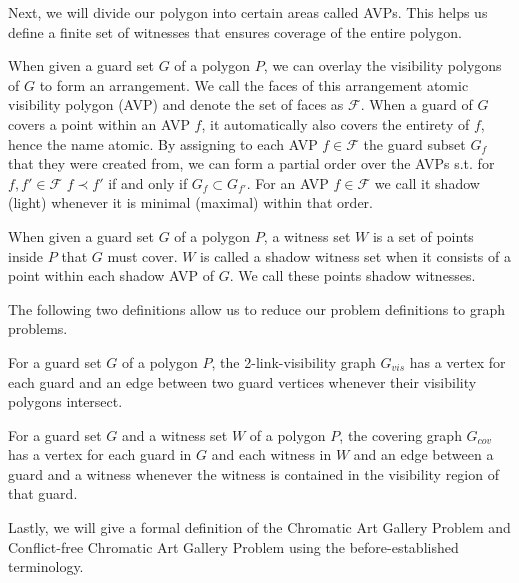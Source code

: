 Next, we will divide our polygon into certain areas called AVPs. This helps us define a finite set of witnesses that ensures coverage of the entire polygon.

\begin{definition}
When given a guard set $G$ of a polygon $P$, we can overlay the visibility polygons of $G$ to form an arrangement. We call the faces of this arrangement atomic visibility polygon (AVP) and denote the set of faces as $\mathcal{F}$. When a guard of $G$ covers a point within an AVP $f$, it automatically also covers the entirety of $f$, hence the name atomic. By assigning to each AVP $f\in\mathcal{F}$ the guard subset $G_{f}$ that they were created from, we can form a partial order over the AVPs s.t. for $f,f'\in\mathcal{F}$ $f\prec f'$ if and only if $G_{f}\subset G_{f'}$. For an AVP $f\in\mathcal{F}$ we call it shadow (light) whenever it is minimal (maximal) within that order.
\end{definition}

\begin{definition}
When given a guard set $G$ of a polygon $P$, a witness set $W$ is a set of points inside $P$ that $G$ must cover. $W$ is called a shadow witness set when it consists of a point within each shadow AVP of $G$. We call these points shadow witnesses.
\end{definition}

The following two definitions allow us to reduce our problem definitions to graph problems.

\begin{definition}
For a guard set $G$ of a polygon $P$, the 2-link-visibility graph $G_{vis}$ has a vertex for each guard and an edge between two guard vertices whenever their visibility polygons intersect.
\end{definition}

\begin{definition}
For a guard set $G$ and a witness set $W$ of a polygon $P$, the covering graph $G_{cov}$ has a vertex for each guard in $G$ and each witness in $W$ and an edge between a guard and a witness whenever the witness is contained in the visibility region of that guard.
\end{definition}

Lastly, we will give a formal definition of the Chromatic Art Gallery Problem and Conflict-free Chromatic Art Gallery Problem using the before-established terminology.

